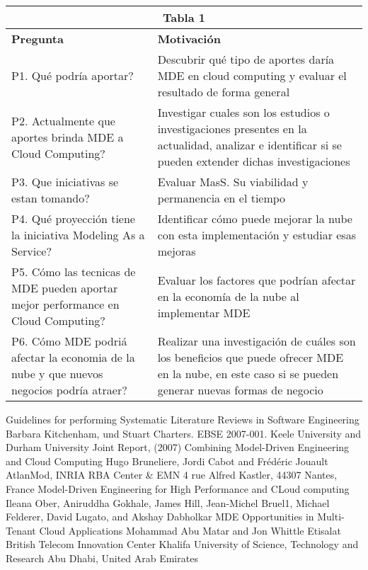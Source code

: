 \documentclass{llncs}
\begin{document}
\begin{tabular}{  | p{5cm} | p{7cm}  | }
  \hline
  \multicolumn{2}{|c|}{\bf Tabla 1} \\
  \hline
  \bf Pregunta & \bf Motivación \\
  \hline
  P1. Qué podría aportar?  & Descubrir qué tipo de aportes daría MDE en cloud computing y evaluar el resultado de forma general\\
  \hline
  P2. Actualmente que aportes brinda MDE a Cloud Computing? & Investigar cuales son los estudios o investigaciones presentes en la actualidad, analizar e identificar si se pueden extender dichas investigaciones\\
  \hline
  P3. Que iniciativas se estan tomando? & Evaluar MasS. Su viabilidad y permanencia en el tiempo\\
  \hline
  P4. Qué proyección tiene la iniciativa Modeling As a Service? & Identificar cómo puede mejorar la nube con esta implementación y estudiar esas mejoras\\
  \hline
  P5. Cómo las tecnicas de MDE pueden aportar mejor performance en Cloud Computing?  & Evaluar los factores que podrían afectar en la economía de la nube al implementar MDE\\
  \hline
  P6. Cómo MDE podriá afectar la economia de la nube y que nuevos negocios podría atraer? & Realizar una investigación de cuáles son los beneficios que puede ofrecer MDE en la nube, en este caso si se pueden generar nuevas formas de negocio\\
  \hline
\end{tabular}
\begin{thebibliography}{1}
Guidelines for performing Systematic Literature Reviews in Software Engineering
Barbara Kitchenham, und Stuart Charters. EBSE 2007-001. Keele University and Durham University Joint Report, (2007)
Combining Model-Driven Engineering and Cloud Computing
Hugo Bruneliere, Jordi Cabot and Frédéric Jouault AtlanMod, INRIA RBA Center & EMN
4 rue Alfred Kastler, 44307 Nantes, France
\bibitem{}
Model-Driven Engineering for High Performance and CLoud computing
Ileana Ober, Aniruddha Gokhale, James Hill, Jean-Michel Bruel1, Michael Felderer, David Lugato, and Akshay Dabholkar
\bibitem{}
MDE Opportunities in Multi-Tenant Cloud Applications
Mohammad Abu Matar and Jon Whittle
Etisalat British Telecom Innovation Center Khalifa University of Science, Technology and Research Abu Dhabi, United Arab Emirates
\end{thebibliography}
\end{document}
